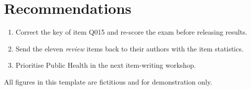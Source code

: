 \documentclass[11pt,a4paper]{article}
\begin{document}
\section{Recommendations}

\begin{recommendation}
\begin{enumerate}[leftmargin=*,nosep]
  \item Correct the key of item Q015 and re-score the exam before releasing results.
  \item Send the eleven \emph{review} items back to their authors with the item statistics.
  \item Prioritise Public Health in the next item-writing workshop.
\end{enumerate}
\end{recommendation}

\vfill
{\footnotesize\color{muted} All figures in this template are fictitious and for demonstration only.}
\end{document}

